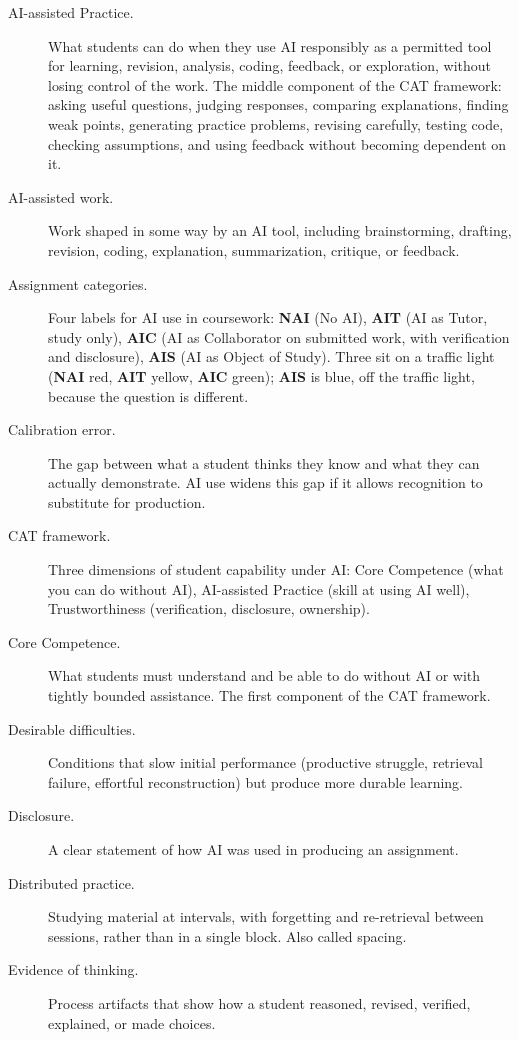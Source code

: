 \documentclass{SIAMbook2023}
\newcommand{\NAI}{\textcolor{catNAI}{\textbf{NAI}}}
\newcommand{\AIT}{\textcolor{catAIT}{\textbf{AIT}}}
\newcommand{\AIC}{\textcolor{catAIC}{\textbf{AIC}}}
\newcommand{\AIS}{\textcolor{catAIS}{\textbf{AIS}}}
\begin{document}
\begin{description}
\item[AI-assisted Practice.] What students can do when they use AI responsibly as a permitted tool for learning, revision, analysis, coding, feedback, or exploration, without losing control of the work. The middle component of the CAT framework: asking useful questions, judging responses, comparing explanations, finding weak points, generating practice problems, revising carefully, testing code, checking assumptions, and using feedback without becoming dependent on it.
\item[AI-assisted work.] Work shaped in some way by an AI tool, including brainstorming, drafting, revision, coding, explanation, summarization, critique, or feedback.
\item[Assignment categories.] Four labels for AI use in coursework: \NAI{} (No AI), \AIT{} (AI as Tutor, study only), \AIC{} (AI as Collaborator on submitted work, with verification and disclosure), \AIS{} (AI as Object of Study). Three sit on a traffic light (\NAI{} red, \AIT{} yellow, \AIC{} green); \AIS{} is blue, off the traffic light, because the question is different.
\item[Calibration error.] The gap between what a student thinks they know and what they can actually demonstrate. AI use widens this gap if it allows recognition to substitute for production.
\item[CAT framework.] Three dimensions of student capability under AI: Core Competence (what you can do without AI), AI-assisted Practice (skill at using AI well), Trustworthiness (verification, disclosure, ownership).
\item[Core Competence.] What students must understand and be able to do without AI or with tightly bounded assistance. The first component of the CAT framework.
\item[Desirable difficulties.] Conditions that slow initial performance (productive struggle, retrieval failure, effortful reconstruction) but produce more durable learning.
\item[Disclosure.] A clear statement of how AI was used in producing an assignment.
\item[Distributed practice.] Studying material at intervals, with forgetting and re-retrieval between sessions, rather than in a single block. Also called spacing.
\item[Evidence of thinking.] Process artifacts that show how a student reasoned, revised, verified, explained, or made choices.

\end{description}
\end{document}
